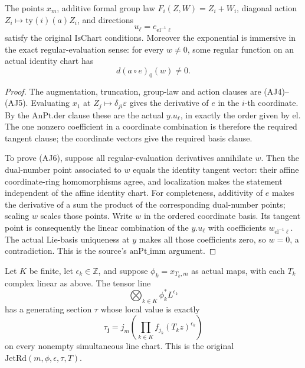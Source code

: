 \begin{srlemma}
\label{lem:ftb-actual-jet-formal-chart}
The points \(x_m\), additive formal group law
\(F_i(Z,W)=Z_i+W_i\), diagonal action
\(Z_i\mapsto\mathrm{ty}(i)(a)Z_i\), and directions
\[
                  u_\ell=e_{\mathrm{el}^{-1}\ell}
\]
satisfy the original \(\mathrm{IsChart}\) conditions.
Moreover the exponential is immersive in the exact
regular-evaluation sense: for every \(w\ne0\), some regular
function on an actual identity chart has
\[
                         d(a\circ e)_0(w)\ne0.           \tag{AJ6}
\]
\end{srlemma}

\begin{proof}
The augmentation, truncation, group-law and action clauses
are (AJ4)--(AJ5).
Evaluating \(x_1\) at
\(Z_j\mapsto\delta_{ji}\varepsilon\) gives the derivative
of \(e\) in the \(i\)-th coordinate.
By the \(\mathrm{AnPt.der}\) clause these are the actual
\(y.u_\ell\), in exactly the order given by \(\mathrm{el}\).
The one nonzero coefficient in a coordinate combination is
therefore the required tangent clause; the coordinate vectors
give the required basis clause.

To prove (AJ6), suppose all regular-evaluation derivatives
annihilate \(w\). Then the dual-number point associated to
\(w\) equals the identity tangent vector: their affine
coordinate-ring homomorphisms agree, and localization makes
the statement independent of the affine identity chart.
For completeness, additivity of \(e\) makes the derivative
of a sum the product of the corresponding dual-number
points; scaling \(w\) scales those points.
Write \(w\) in the ordered coordinate basis.
Its tangent point is consequently the linear combination
of the \(y.u_\ell\) with coefficients
\(w_{\mathrm{el}^{-1}\ell}\).
The actual Lie-basis uniqueness at \(y\) makes all those
coefficients zero, so \(w=0\), a contradiction.
This is the source's \(\mathrm{anPt\_imm}\) argument.
\end{proof}

\begin{srlemma}
\label{lem:ftb-actual-jet-generator}
Let \(K\) be finite, let \(\epsilon_k\in\mathbb Z\), and suppose
\(\phi_k=x_{T_k,m}\) as actual maps, with each \(T_k\) complex
linear as above. The tensor line
\[
                        \bigotimes_{k\in K}\phi_k^*L^{\epsilon_k}
\]
has a generating section \(\tau\) whose local value is exactly
\[
                   \tau_{\mathbf j}
                       =j_m\!\left(\prod_{k\in K}
                                      f_{j_k}(T_kz)^{\epsilon_k}\right)
                                                               \tag{AJ7}
\]
on every nonempty simultaneous line chart.
This is the original \(\mathrm{JetRd}(m,\phi,\epsilon,\tau,T)\).
\end{srlemma}

